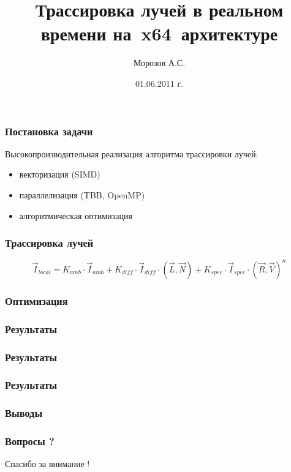 \documentclass[utf8]{beamer}
\title{Трассировка лучей в реальном времени на~x64~архитектуре}
\author{Морозов А.С.}
\date{01.06.2011 г.}
\begin{document}
\begin{frame}
\titlepage
\end{frame}

\begin{frame}
\frametitle{Постановка задачи}
Высокопроизводительная реализация алгоритма трассировки лучей:
\begin{itemize}
\item векторизация (SIMD)
\item параллелизация (TBB, OpenMP)
\item алгоритмическая оптимизация
\end{itemize}
\end{frame}

\begin{frame}
\frametitle{Трассировка лучей}
$$
 \vec{I}_{local} =  K_{amb} \cdot \vec{I}_{amb} +  K_{diff} \cdot \vec{I}_{diff} \cdot \left( \vec{L},\vec{N} \right) + K_{spec} \cdot \vec{I}_{spec} \cdot \left( \vec{R},\vec{V} \right)^n
$$
\end{frame}


\begin{frame}
\frametitle{Оптимизация}
\end{frame}

\begin{frame}
\frametitle{Результаты}
\end{frame}

\begin{frame}
\frametitle{Результаты}
\end{frame}

\begin{frame}
\frametitle{Результаты}
\end{frame}

\begin{frame}
\frametitle{Выводы}
\end{frame}

\begin{frame}
\frametitle{Вопросы ?}
\begin{center}
{\huge Спасибо за внимание !}
\end{center}
\end{frame}
\end{document}
